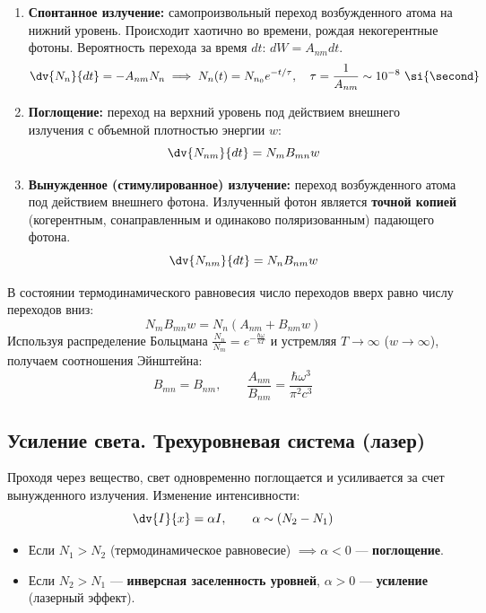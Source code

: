 \begin{enumerate}
	\item \textbf{Спонтанное излучение:} самопроизвольный переход возбужденного атома на нижний уровень. Происходит хаотично во времени, рождая некогерентные фотоны. Вероятность перехода за время $dt$: $dW = A_{nm} dt$.
	\begin{equation}
		\dv{N_n}{dt} = -A_{nm} N_n \implies N_n(t) = N_{n_0} e^{-t/\tau}, \quad \tau = \frac{1}{A_{nm}} \sim 10^{-8} \ \si{\second}
	\end{equation}
	\item \textbf{Поглощение:} переход на верхний уровень под действием внешнего излучения с объемной плотностью энергии $w$:
	\begin{equation}
		\dv{N_{nm}}{dt} = N_m B_{mn} w
	\end{equation}
	\item \textbf{Вынужденное (стимулированное) излучение:} переход возбужденного атома под действием внешнего фотона. Излученный фотон является \textbf{точной копией} (когерентным, сонаправленным и одинаково поляризованным) падающего фотона.
	\begin{equation}
		\dv{N_{nm}}{dt} = N_n B_{nm} w
	\end{equation}
\end{enumerate}

В состоянии термодинамического равновесия число переходов вверх равно числу переходов вниз:
\begin{equation}
	N_m B_{mn} w = N_n (A_{nm} + B_{nm} w)
\end{equation}
Используя распределение Больцмана $\frac{N_n}{N_m} = e^{-\frac{\hbar\omega}{kT}}$ и устремляя $T \to \infty$ ($w \to \infty$), получаем соотношения Эйнштейна:
\begin{equation}
	B_{mn} = B_{nm}, \qquad \frac{A_{nm}}{B_{nm}} = \frac{\hbar\omega^3}{\pi^2 c^3}
\end{equation}

\subsection{Усиление света. Трехуровневая система (лазер)}

Проходя через вещество, свет одновременно поглощается и усиливается за счет вынужденного излучения. Изменение интенсивности:
\begin{equation}
	\dv{I}{x} = \alpha I, \qquad \alpha \sim (N_2 - N_1)
\end{equation}
\begin{itemize}
	\item Если $N_1 > N_2$ (термодинамическое равновесие) $\implies \alpha < 0$ --- \textbf{поглощение}.
	\item Если $N_2 > N_1$ --- \textbf{инверсная заселенность уровней}, $\alpha > 0$ --- \textbf{усиление} (лазерный эффект).
\end{itemize}

